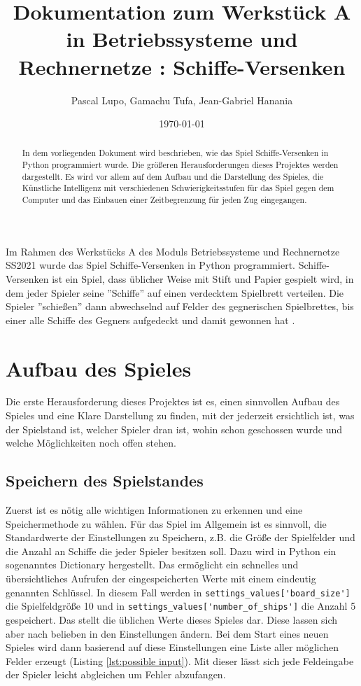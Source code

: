 \documentclass{article}
\title{Dokumentation zum Werkstück A in Betriebssysteme und Rechnernetze : Schiffe-Versenken}
\author{Pascal Lupo, Gamachu Tufa, Jean-Gabriel Hanania}
\date{\today}
\begin{document}
\maketitle
\thispagestyle{empty} %

\begin{abstract}
    In dem vorliegenden Dokument wird beschrieben, wie das Spiel Schiffe-Versenken in Python programmiert wurde. Die größeren Herausforderungen dieses Projektes werden dargestellt. Es wird vor allem auf dem Aufbau und die Darstellung des Spieles, die Künstliche Intelligenz mit verschiedenen Schwierigkeitsstufen für das Spiel gegen dem Computer und das Einbauen einer Zeitbegrenzung für jeden Zug eingegangen.
\end{abstract}

\section*{}
    Im Rahmen des Werkstücks A des Moduls Betriebssysteme und Rechnernetze SS2021 wurde das Spiel Schiffe-Versenken in Python programmiert. Schiffe-Versenken ist ein Spiel, dass üblicher Weise mit Stift und Papier gespielt wird, in dem jeder Spieler seine ''Schiffe'' auf einen verdecktem Spielbrett verteilen. Die Spieler ''schießen'' dann abwechselnd auf Felder des gegnerischen Spielbrettes, bis einer alle Schiffe des Gegners aufgedeckt und damit gewonnen hat .


\section{Aufbau des Spieles}
    Die erste Herausforderung dieses Projektes ist es, einen sinnvollen Aufbau des Spieles und eine Klare Darstellung zu finden, mit der jederzeit ersichtlich ist, was der Spielstand ist, welcher Spieler dran ist, wohin schon geschossen wurde und welche Möglichkeiten noch offen stehen.

\subsection{Speichern des Spielstandes}
    Zuerst ist es nötig alle wichtigen Informationen zu erkennen und eine Speichermethode zu wählen. Für das Spiel im Allgemein ist es sinnvoll, die Standardwerte der Einstellungen zu Speichern, z.B. die Größe der Spielfelder und die Anzahl an Schiffe die jeder Spieler besitzen soll. Dazu wird in Python ein sogenanntes Dictionary hergestellt. Das ermöglicht ein schnelles und übersichtliches Aufrufen der eingespeicherten Werte mit einem eindeutig genannten Schlüssel. In diesem Fall werden in \verb$settings_values['board_size']$ die Spielfeldgröße 10 und in \verb$settings_values['number_of_ships']$ die Anzahl 5 gespeichert. Das stellt  die üblichen Werte dieses Spieles dar. Diese lassen sich aber nach belieben in den Einstellungen ändern. Bei dem Start eines neuen Spieles wird dann basierend auf diese Einstellungen eine Liste aller möglichen Felder erzeugt (Listing \ref{lst:possible input}). Mit dieser lässt sich jede Feldeingabe der Spieler leicht abgleichen um Fehler abzufangen.
\end{document}
